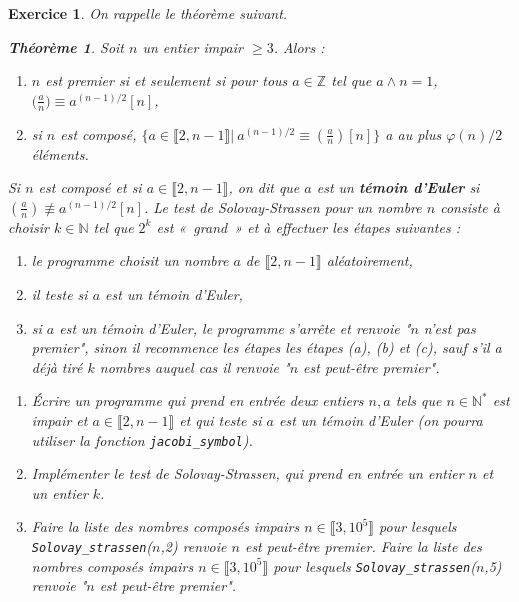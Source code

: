 \documentclass[11pt,a4paper]{article}
\newtheorem*{thm}{Théorème}
\newtheorem{ex}{Exercice}
\newcommand{\N}{\mathbb{N}}
\newcommand{\Z}{\mathbb{Z}}
\begin{document}
\begin{ex}
 On rappelle le théorème suivant.

\begin{thm} 
Soit  $n$ un entier impair $\geq 3$. Alors :\begin{enumerate}
\item $n$ est premier si et seulement si pour tous $a\in \Z$ tel que $a\wedge n=1$, $ \big( \tfrac{a}{n} \big)\equiv a^{(n-1)/2} [n]$,

\item si $n$ est composé, $\{a\in \llbracket 2,n-1\rrbracket|\ a^{(n-1)/2}\equiv \left(\frac{a}{n}\right) [n]\}$ a au plus $\varphi(n)/2$ éléments.
\end{enumerate}
\end{thm}

Si $n$ est composé et si $a\in \llbracket 2,n-1\rrbracket$, on dit que $a$ est un \textbf{témoin d'Euler} si $\left(\frac{a}{n}\right)\not \equiv a^{(n-1)/2}[n]$. Le test de Solovay-Strassen pour un nombre $n$ consiste à choisir $k\in \N$ tel que $2^k$ est «~grand~» et à effectuer les étapes suivantes : \begin{enumerate}
\item le programme choisit un nombre $a$ de $\llbracket 2,n-1\rrbracket$  aléatoirement,

\item il teste si $a$ est un témoin d'Euler,

\item si $a$ est un témoin d'Euler, le programme s'arrête et renvoie "$n$ n'est pas premier", sinon il   recommence les étapes les étapes (a), (b) et (c), sauf s'il a déjà tiré $k$ nombres auquel cas il renvoie "$n$ est peut-être premier".
\end{enumerate}

\begin{enumerate}
\item Écrire un programme qui prend en entrée deux entiers $n,a$ tels que $n\in \N^*$ est impair et $a\in \llbracket 2,n-1\rrbracket$ et qui teste si $a$ est un témoin d'Euler (on pourra utiliser la fonction \texttt{jacobi\_symbol}). 

\item Implémenter le test de Solovay-Strassen, qui prend en entrée un entier $n$ et un entier $k$.

\item Faire la liste des nombres composés impairs $n\in \llbracket 3,10^5\rrbracket$ pour lesquels \texttt{Solovay\_strassen}($n$,2) renvoie $n$ est peut-être premier. Faire la liste des nombres composés impairs $n\in \llbracket 3,10^5\rrbracket$ pour lesquels \texttt{Solovay\_strassen}($n$,5) renvoie "$n$ est peut-être premier". 
\end{enumerate}

\end{ex}
\end{document}
